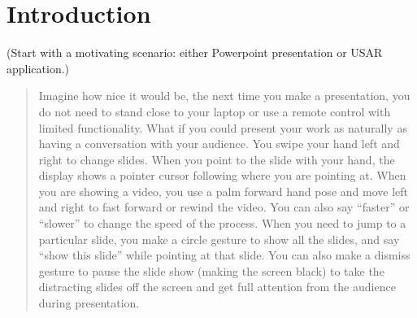 \chapter{Introduction}
(Start with a motivating scenario: either Powerpoint presentation or USAR
application.)
% 
% 
\begin{quotation}
Imagine how nice it would be, the next time you make a presentation, you do
not need to stand close to your laptop or use a remote control with limited
functionality. What if you could present your work as naturally as having a
conversation with your audience. You swipe your hand left and right to change slides. When you point to the slide
with your hand, the display shows a pointer cursor following where you are
pointing at. When you are showing a video,
you use a palm forward hand pose and move left and right to fast forward or
rewind the video. You can also say ``faster'' or ``slower'' to change the speed
of the process. When you need to jump to a particular slide, you make a circle
gesture to show all the slides, and say ``show this
slide'' while pointing at that slide. You can also make a dismiss gesture to
pause the slide show (making the screen black) to take the distracting slides off the
screen and get full attention from the audience during presentation.
\end{quotation}

